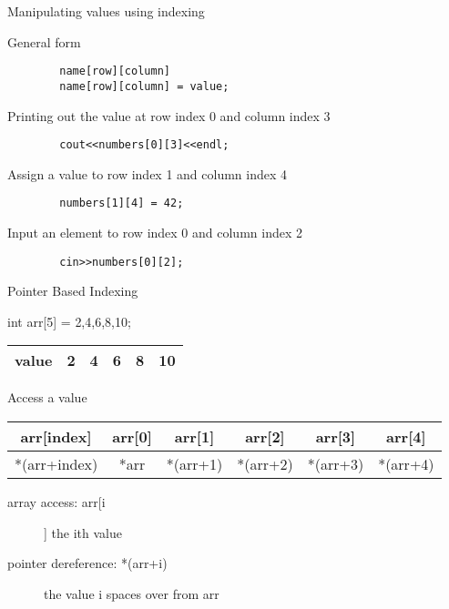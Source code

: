 \documentclass[xcolor={dvipsnames}]{beamer}
\begin{document}
\begin{frame}[fragile]{Manipulating values using indexing}
	\begin{block}{General form}
	\begin{verbatim}
		name[row][column]
		name[row][column] = value;
	\end{verbatim}
	\end{block}
	\pause
	\begin{block}{Printing out the value at row index 0 and column index 3}
	\begin{verbatim}
		cout<<numbers[0][3]<<endl;
	\end{verbatim}
	\end{block}
	\pause
	\begin{block}{Assign a value to row index 1 and column index 4}
	\begin{verbatim}
		numbers[1][4] = 42;
	\end{verbatim}
	\end{block}
	\pause
	\begin{block}{Input an element to row index 0 and column index 2}
	\begin{verbatim}
		cin>>numbers[0][2];
	\end{verbatim}
	\end{block}
\end{frame}

\begin{frame}[fragile]{Pointer Based Indexing}
\begin{block}{int arr[5] = {2,4,6,8,10};}
	\begin{table}
	\Huge
	\begin{tabular}{|c|c|c|c|c|c|}
	\hline
	value & 2  & 4 & 6 & 8 & 10\\
	\hline
	\end{tabular}
\end{table}
\end{block}
\begin{block}{Access a value}
	\begin{table}
	\begin{tabular}{|c|c|c|c|c|c|}
	\hline
	arr[index]  & arr[0]  & arr[1] & arr[2] & arr[3] & arr[4]\\
	\hline
        *(arr+index) & *arr & *(arr+1) & *(arr+2) & *(arr+3) & *(arr+4)\\
	\hline
	\end{tabular}
\end{table}
\begin{description}
	\item[array access: arr[i]] the ith value 
	\item[pointer dereference: *(arr+i)] the value i spaces over from arr
\end{description}
\end{block}
\end{frame}
\end{document}
